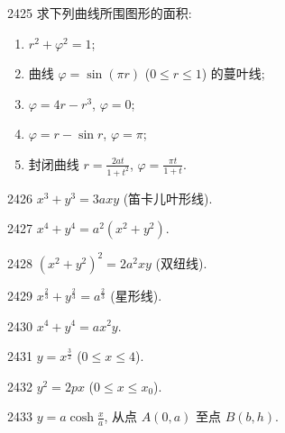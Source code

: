 \begin{prob}[L]{2425}
求下列曲线所围图形的面积:
\begin{enumerate}[label=(\alph*), itemsep=2pt, topsep=3pt]
\item $r^2 + \varphi^2 = 1$;
\item 曲线 $\varphi = \sin(\pi r)$ ($0 \leqslant r \leqslant 1$) 的蔓叶线;
\item $\varphi = 4r - r^3$, $\varphi = 0$;
\item $\varphi = r - \sin r$, $\varphi = \pi$;
\item 封闭曲线 $r = \frac{2at}{1+t^2}$, $\varphi = \frac{\pi t}{1+t}$.
\end{enumerate}
\end{prob}


\begin{prob}[S]{2426}
$x^3 + y^3 = 3axy$ (笛卡儿叶形线).
\end{prob}

\begin{prob}[S]{2427}
$x^4 + y^4 = a^2(x^2 + y^2)$.
\end{prob}

\begin{prob}[S]{2428}
$(x^2 + y^2)^2 = 2a^2 xy$ (双纽线).
\end{prob}


\begin{prob}[S]{2429}
$x^{\frac{2}{3}} + y^{\frac{2}{3}} = a^{\frac{2}{3}}$ (星形线).
\end{prob}

\begin{prob}[M]{2430}
$x^4 + y^4 = ax^2 y$.
\end{prob}



\begin{prob}[S]{2431}
$y = x^{\frac{3}{2}}$ ($0 \leqslant x \leqslant 4$).
\end{prob}

\begin{prob}[S]{2432}
$y^2 = 2px$ ($0 \leqslant x \leqslant x_0$).
\end{prob}

\begin{prob}[S]{2433}
$y = a\cosh\frac{x}{a}$, 从点 $A(0, a)$ 至点 $B(b, h)$.
\end{prob}


